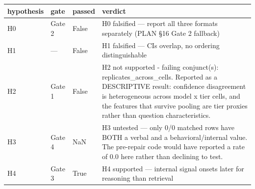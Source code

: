\begin{tabular}{llll}
\toprule
hypothesis & gate & passed & verdict \\
\midrule
H0 & Gate 2 & False & H0 falsified — report all three formats separately (PLAN §16 Gate 2 fallback) \\
H1 & — & False & H1 falsified — CIs overlap, no ordering distinguishable \\
H2 & Gate 1 & False & H2 not supported - failing conjunct(s): replicates\_across\_cells. Reported as a DESCRIPTIVE result: confidence disagreement is heterogeneous across model x tier cells, and the features that survive pooling are tier proxies rather than question characteristics. \\
H3 & Gate 4 & NaN & H3 untested — only 0/0 matched rows have BOTH a verbal and a behavioral/internal value. The pre-repair code would have reported a rate of 0.0 here rather than declining to test. \\
H4 & Gate 3 & True & H4 supported — internal signal onsets later for reasoning than retrieval \\
\bottomrule
\end{tabular}
